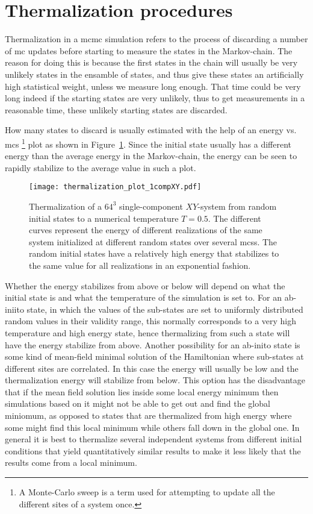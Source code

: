 \section{Thermalization procedures}

Thermalization in a \ac{mcmc} simulation refers to the process of discarding a number of \ac{mc} updates before starting to measure the
states in the Markov-chain. The reason for doing this is because the first states in the chain will usually be very unlikely states in the
ensamble of states, and thus give these states an artificially high statistical weight, unless we measure long enough.
That time could be very long indeed if the starting states are very unlikely, thus to get
measurements in a reasonable time, these unlikely starting states are discarded.

How many states to discard is usually estimated with the help of an energy vs. \ac{mcs}%
\footnote{A Monte-Carlo sweep is a term used for attempting to update all the different sites of a system once.} %
plot as shown in Figure~\ref{fig:Monte:therm_plot}. Since the initial state usually has a different energy than the average energy in the Markov-chain,
the energy can be seen to rapidly stabilize to the average value in such a plot. 

\begin{figure}[t]
    \centering
    \texttt{[image: thermalization\_plot\_1compXY.pdf]}
    \caption{Thermalization of a $64^3$ single-component $XY$-system from random initial states to a numerical temperature $T=0.5$.
    The different curves represent the energy of different realizations of the same
    system initialized at different random states over several \ac{mcs}s. The random initial states have a relatively high energy that stabilizes
    to the same value for all realizations in an exponential fashion.}
    \label{fig:Monte:therm_plot}
\end{figure}

Whether the energy stabilizes from above or below will depend
on what the initial state is and what the temperature of the simulation is set to. For an ab-iniito state, in which the values of the sub-states
are set to uniformly distributed random values in their validity range, this normally corresponds to a very high temperature and
high energy state, hence thermalizing from such a state will have the energy stabilize from above. Another possibility for an ab-inito
state is some kind of mean-field minimal solution of the Hamiltonian where sub-states at different sites are correlated. In this case the
energy will usually be low and the thermalization energy will stabilize from below. This option has the disadvantage that if the mean field
solution lies inside some local energy minimum then simulations based on it might not be able to get out and find the global miniomum,
as opposed to states that are thermalized from high energy where some might find this local minimum while others fall down in the global one.
In general it is best to thermalize several independent systems from different initial conditions that yield quantitatively similar results
to make it less likely that the results come from a local minimum.

